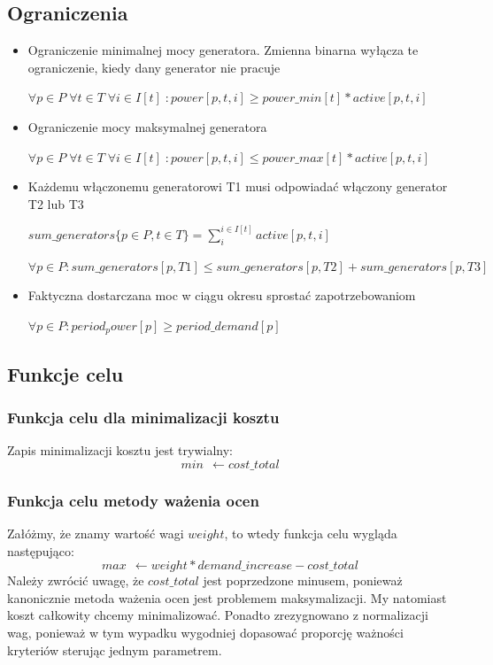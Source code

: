 \documentclass[12pt, twoside, hidelinks, a4paper]{article}
\begin{document}
\subsection{Ograniczenia}
\begin{itemize}
\item Ograniczenie minimalnej mocy generatora. Zmienna binarna wyłącza te ograniczenie, kiedy dany generator nie pracuje

$\forall p \in P \; \forall t \in T \; \forall i \in I[t] \; : power[p,t,i] 
\geqslant power\_min[t] * active[p,t,i]$
\item Ograniczenie mocy maksymalnej generatora

$\forall p \in P \; \forall t \in T \; \forall i \in I[t] \; : power[p,t,i] \leqslant power\_max[t] * active[p,t,i]$
\item Każdemu włączonemu generatorowi T1 musi odpowiadać włączony generator T2 lub T3

$sum\_generators \{ p \in P, t \in T \} = \sum_{i}^{i \in I[t]} active[p,t,i]$

$\forall p \in P : sum\_generators[p,T1] \leqslant sum\_generators[p,T2] + sum\_generators[p,T3]$
\item Faktyczna dostarczana moc w ciągu okresu sprostać zapotrzebowaniom

$\forall p \in P : period_power[p] \geqslant period\_demand[p]$
\end{itemize}

\subsection{Funkcje celu}
\subsubsection{Funkcja celu dla minimalizacji kosztu}
Zapis minimalizacji kosztu jest trywialny:
$$min \: \: \leftarrow cost\_total$$

\subsubsection{Funkcja celu metody ważenia ocen}
Załóżmy, że znamy wartość wagi $weight$, to wtedy funkcja celu wygląda następująco:
$$max \: \: \leftarrow weight*demand\_increase - cost\_total$$
Należy zwrócić uwagę, że $cost\_total$ jest poprzedzone minusem, ponieważ kanonicznie metoda ważenia ocen jest problemem maksymalizacji. My natomiast koszt całkowity chcemy minimalizować. Ponadto zrezygnowano z normalizacji wag, ponieważ w tym wypadku wygodniej dopasować proporcję ważności kryteriów sterując jednym parametrem.
\end{document}
